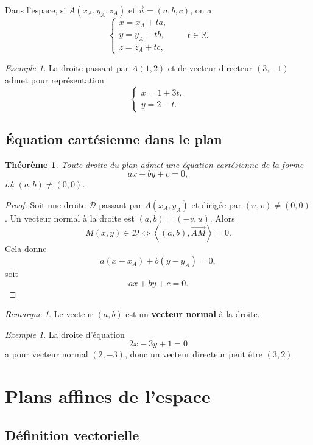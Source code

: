 \documentclass[11pt,a4paper]{article}
\newtheorem{theoreme}[definition]{Théorème}
\theoremstyle{remark}
\newtheorem{remarque}[definition]{Remarque}
\newtheorem{exemple}[definition]{Exemple}
\newcommand{\R}{\mathbb{R}}
\newcommand{\scal}[2]{\left\langle #1,#2\right\rangle}
\begin{document}
Dans l’espace, si \(A(x_A,y_A,z_A)\) et \(\vec{u}=(a,b,c)\), on a
\[
\begin{cases}
x=x_A+ta,\\
y=y_A+tb,\\
z=z_A+tc,
\end{cases}
\qquad t\in\R.
\]

\begin{exemple}
La droite passant par \(A(1,2)\) et de vecteur directeur \((3,-1)\) admet pour représentation
\[
\begin{cases}
x=1+3t,\\
y=2-t.
\end{cases}
\]
\end{exemple}

\subsection{Équation cartésienne dans le plan}

\begin{theoreme}
Toute droite du plan admet une équation cartésienne de la forme
\[
ax+by+c=0,
\]
où \((a,b)\neq (0,0)\).
\end{theoreme}

\begin{proof}
Soit une droite \(\mathcal D\) passant par \(A(x_A,y_A)\) et dirigée par \((u,v)\neq (0,0)\).  
Un vecteur normal à la droite est \((a,b)=(-v,u)\). Alors
\[
M(x,y)\in\mathcal D
\Longleftrightarrow
\scal{(a,b)}{\overrightarrow{AM}}=0.
\]
Cela donne
\[
a(x-x_A)+b(y-y_A)=0,
\]
soit
\[
ax+by+c=0.
\]
\end{proof}

\begin{remarque}
Le vecteur \((a,b)\) est un \textbf{vecteur normal} à la droite.
\end{remarque}

\begin{exemple}
La droite d’équation
\[
2x-3y+1=0
\]
a pour vecteur normal \((2,-3)\), donc un vecteur directeur peut être \((3,2)\).
\end{exemple}

\section{Plans affines de l’espace}

\subsection{Définition vectorielle}
\end{document}
